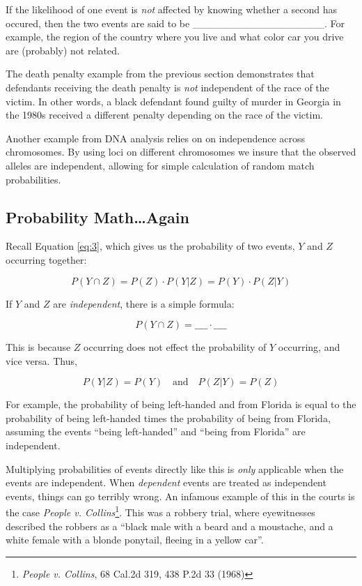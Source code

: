 \documentclass[]{book}
\let\rmarkdownfootnote\footnote%
\def\footnote{\protect\rmarkdownfootnote}
\theoremstyle{definition}
\theoremstyle{definition}
\theoremstyle{remark}
\begin{document}
If the likelihood of one event is \emph{not} affected by knowing whether
a second has occured, then the two events are said to be
\_\_\_\_\_\_\_\_\_\_\_\_\_\_\_\_\_\_. For example, the region of the
country where you live and what color car you drive are (probably) not
related.

The death penalty example from the previous section demonstrates that
defendants receiving the death penalty is \emph{not} independent of the
race of the victim. In other words, a black defendant found guilty of
murder in Georgia in the 1980s received a different penalty depending on
the race of the victim.

Another example from DNA analysis relies on on independence across
chromosomes. By using loci on different chromosomes we insure that the
observed alleles are independent, allowing for simple calculation of
random match probabilities.

\subsection{Probability Math\ldots{}Again}\label{probability-mathagain}

Recall Equation \ref{eq:3}, which gives us the probability of two
events, \(Y\) and \(Z\) occurring together:

\[ P(Y \cap Z) = P(Z)\cdot P(Y|Z) = P(Y) \cdot P(Z|Y) \]

If \(Y\) and \(Z\) are \emph{independent}, there is a simple formula:

\[P(Y \cap Z) = \_\_\_\_ \cdot \_\_\_\_\]

This is because \(Z\) occurring does not effect the probability of \(Y\)
occurring, and vice versa. Thus,

\[ P(Y|Z) = P(Y) \quad \text{and} \quad P(Z|Y) = P(Z)\]

For example, the probability of being left-handed and from Florida is
equal to the probability of being left-handed times the probability of
being from Florida, assuming the events ``being left-handed'' and
``being from Florida'' are independent.

Multiplying probabilities of events directly like this is \emph{only}
applicable when the events are independent. When \emph{dependent} events
are treated as independent events, things can go terribly wrong. An
infamous example of this in the courts is the case
\textit{People v. Collins}\footnote{\emph{People v. Collins}, 68 Cal.2d
  319, 438 P.2d 33 (1968)}. This was a robbery trial, where eyewitnesses
described the robbers as a ``black male with a beard and a moustache,
and a white female with a blonde ponytail, fleeing in a yellow car''.
\end{document}
